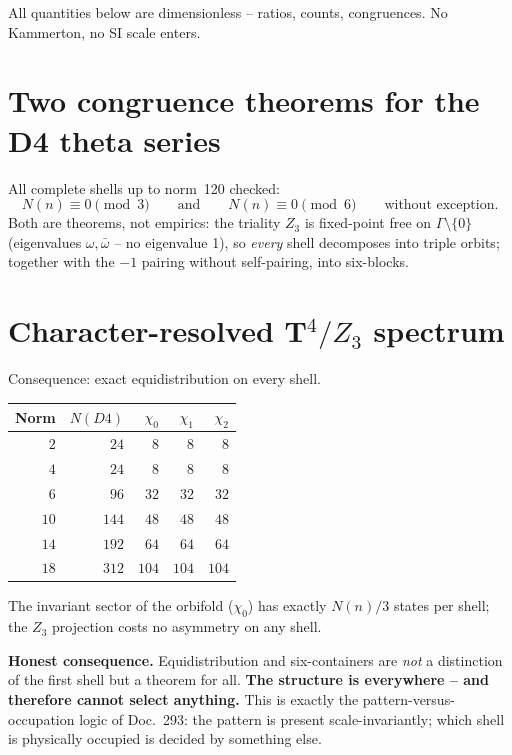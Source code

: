 All quantities below are dimensionless -- ratios, counts,
congruences. No Kammerton, no SI scale enters.

\section{Two congruence theorems for the D4 theta series}

All complete shells up to norm~120 checked:
\begin{equation}
  N(n) \equiv 0 \pmod 3
  \qquad\text{and}\qquad
  N(n) \equiv 0 \pmod 6
  \qquad\text{without exception.}
\end{equation}
Both are theorems, not empirics: the triality $Z_3$ is fixed-point
free on $\Gamma\setminus\{0\}$ (eigenvalues $\omega,\bar\omega$ --
no eigenvalue 1), so \emph{every} shell decomposes into triple
orbits; together with the $-1$ pairing without self-pairing, into
six-blocks.

\section{Character-resolved T$^4/Z_3$ spectrum}

Consequence: exact equidistribution on every shell.

\begin{center}
\begin{tabular}{rrrrr}
\toprule
Norm & $N(D4)$ & $\chi_0$ & $\chi_1$ & $\chi_2$ \\
\midrule
$2$ & $24$ & $8$ & $8$ & $8$ \\
$4$ & $24$ & $8$ & $8$ & $8$ \\
$6$ & $96$ & $32$ & $32$ & $32$ \\
$10$ & $144$ & $48$ & $48$ & $48$ \\
$14$ & $192$ & $64$ & $64$ & $64$ \\
$18$ & $312$ & $104$ & $104$ & $104$ \\
\bottomrule
\end{tabular}
\end{center}

The invariant sector of the orbifold ($\chi_0$) has exactly $N(n)/3$
states per shell; the $Z_3$ projection costs no asymmetry on any
shell.

\textbf{Honest consequence.} Equidistribution and six-containers are
\emph{not} a distinction of the first shell but a theorem for all.
\textbf{The structure is everywhere -- and therefore cannot select
anything.} This is exactly the pattern-versus-occupation logic of
Doc.~293: the pattern is present scale-invariantly; which shell is
physically occupied is decided by something else.

